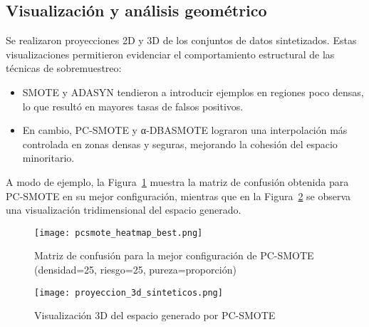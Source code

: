 \subsection{Visualización y análisis geométrico}

Se realizaron proyecciones 2D y 3D de los conjuntos de datos sintetizados. Estas visualizaciones permitieron evidenciar el comportamiento estructural de las técnicas de sobremuestreo:

\begin{itemize}
  \item SMOTE y ADASYN tendieron a introducir ejemplos en regiones poco densas, lo que resultó en mayores tasas de falsos positivos.
  \item En cambio, PC-SMOTE y α‑DBASMOTE lograron una interpolación más controlada en zonas densas y seguras, mejorando la cohesión del espacio minoritario.
\end{itemize}

A modo de ejemplo, la Figura~\ref{fig:pcsmote_best_heatmap} muestra la matriz de confusión obtenida para PC-SMOTE en su mejor configuración, mientras que en la Figura~\ref{fig:proyeccion_3d_sinteticos} se observa una visualización tridimensional del espacio generado.

\begin{figure}[H]
  \centering
  \texttt{[image: pcsmote\_heatmap\_best.png]}
  \caption{Matriz de confusión para la mejor configuración de PC-SMOTE (densidad=25, riesgo=25, pureza=proporción)}
  \label{fig:pcsmote_best_heatmap}
\end{figure}

\begin{figure}[H]
  \centering
  \texttt{[image: proyeccion\_3d\_sinteticos.png]}
  \caption{Visualización 3D del espacio generado por PC-SMOTE}
  \label{fig:proyeccion_3d_sinteticos}
\end{figure}
